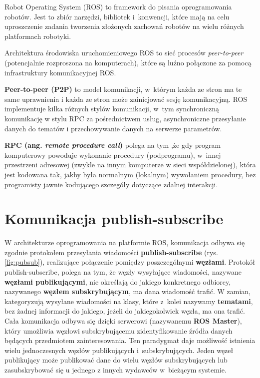 Robot Operating System (ROS) to framework do pisania oprogramowania robotów.
Jest to zbiór narzędzi, bibliotek i~konwencji, które mają na celu uproszczenie
zadania tworzenia złożonych zachowań robotów na wielu różnych platformach
robotyki.

Architektura środowiska uruchomieniowego ROS to sieć procesów
\textit{peer-to-peer} (potencjalnie rozproszona na komputerach), które są luźno
połączone za pomocą infrastruktury komunikacyjnej ROS.

\textbf{Peer-to-peer (P2P)} to model komunikacji, w~którym każda ze stron ma te
same uprawnienia i każda ze stron może zainicjować sesję komunikacyjną.
ROS implementuje kilka różnych stylów komunikacji, w~tym synchroniczną
komunikację w stylu RPC za pośrednictwem usług, asynchroniczne przesyłanie
danych do tematów i przechowywanie danych na serwerze parametrów.

\textbf{RPC (ang. \textit{remote procedure call})} polega na tym ,że gdy
program komputerowy powoduje wykonanie procedury (podprogramu), w~innej
przestrzeni adresowej (zwykle na innym komputerze w sieci współdzielonej),
która jest kodowana tak, jakby była normalnym (lokalnym) wywołaniem procedury,
bez programisty jawnie kodującego szczegóły dotyczące zdalnej interakcji.

\section{Komunikacja publish-subscribe}
W architekturze oprogramowania na platformie ROS, komunikacja odbywa się
zgodnie protokołem przesyłania wiadomości \textbf{publish-subscribe} (rys.
\ref{fig:pubsub}), realizujące połączenie pomiędzy poszczególnymi
\textbf{węzłami}.
Protokół publish-subscribe, polega na tym, że węzły wysyłające wiadomości,
nazywane \textbf{węzłami publikującymi}, nie określają
do jakiego konkretnego odbiorcy, nazywanego \textbf{węzłem subskrybującym}, ma
dana wiadomość trafić.
W zamian, kategoryzują wysyłane wiadomości na klasy, które z~kolei nazywamy
\textbf{tematami}, bez żadnej informacji do jakiego,
jeżeli do jakiegokolwiek węzła, ma ona trafić.
Cała komunikacja odbywa się dzięki serwerowi (nazywanemu \textbf{ROS Master}),
który umożliwia węzłowi subskrybującemu zidentyfikowanie źródła danych będących
przedmiotem zainteresowania.
Ten paradygmat daje możliwość istnienia wielu jednoczesnych
węzłów publikujących i~subskrybujących.
Jeden węzeł publikujący może publikować dane do wielu węzłów subskrybujących
lub zasubskrybować się u jednego z innych wydawców w~bieżącym systemie.

